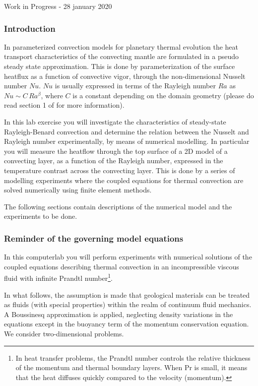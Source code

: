 
{\Large Work in Progress - 28 january 2020}

\subsubsection{Introduction}

In parameterized convection models for planetary thermal evolution the heat transport characteristics 
of the convecting mantle are formulated in a pseudo steady state approximation. 
This is done by parameterization of the surface heatflux as a function of convective vigor, 
through the non-dimensional Nusselt number $Nu$. 
$Nu$ is usually expressed in terms of the 
Rayleigh number $Ra$ as $Nu \sim C\, Ra^\beta$, where $C$ is a constant depending on the domain geometry
(please do read section 1 of \cite{wodd09} for more information).


In this lab exercise you will investigate the characteristics of steady-state Rayleigh-Benard convection 
and determine the relation between the Nusselt and Rayleigh number experimentally, 
by means of numerical modelling. In particular you will measure the heatflow through the top surface of 
a 2D model of a convecting layer, as a function of the Rayleigh number, expressed in the temperature 
contrast across the convecting layer. 
This is done by a series of modelling experiments where the coupled equations for thermal convection are solved 
numerically using finite element methods.

The following sections contain descriptions of the numerical model and the experiments to be done. 

\subsubsection{Reminder of the governing model equations}

In this computerlab you will perform experiments with numerical solutions of the coupled equations describing thermal convection in an incompressible viscous fluid with infinite Prandtl number\footnote{In heat transfer problems, the Prandtl number controls the relative thickness of the momentum and thermal boundary layers. When Pr is small, it means that the heat diffuses quickly compared to the velocity (momentum).}.

In what follows, the assumption is made that geological materials can be treated as fluids (with 
special properties) within the realm of continuum fluid mechanics.
A Boussinesq approximation is applied, neglecting density variations in the equations except in the buoyancy term of the momentum conservation equation. We consider two-dimensional problems.


